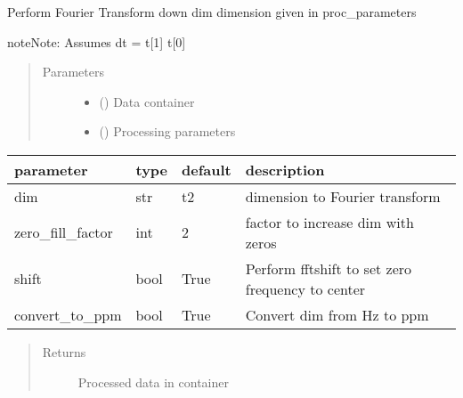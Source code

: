 \documentclass[letterpaper,10pt,english]{sphinxmanual}
\begin{document}
\begin{fulllineitems}
\label{\detokenize{dnpNMR:dnpLab.dnpNMR.fourier_transform}}
Perform Fourier Transform down dim dimension given in proc\_parameters

\begin{sphinxadmonition}{note}{Note:}
Assumes dt = t{[}1{]} \sphinxhyphen{} t{[}0{]}
\end{sphinxadmonition}
\begin{quote}\begin{description}
\item[{Parameters}] \leavevmode\begin{itemize}
\item {} 
 ({\hyperref[\detokenize{dnpData:dnpLab.dnpdata}]{}}\sphinxstyleliteralemphasis{\sphinxupquote{, }}) \sphinxhyphen{}\sphinxhyphen{} Data container

\item {} 
 (\sphinxstyleliteralemphasis{\sphinxupquote{, }}) \sphinxhyphen{}\sphinxhyphen{} Processing parameters

\end{itemize}

\end{description}\end{quote}


\begin{savenotes}\sphinxattablestart
\centering
\begin{tabulary}{\linewidth}[t]{|T|T|T|T|}
\hline

parameter
&
type
&
default
&
description
\\
\hline
dim
&
str
&
\textquotesingle{}t2\textquotesingle{}
&
dimension to Fourier transform
\\
\hline
zero\_fill\_factor
&
int
&
2
&
factor to increase dim with zeros
\\
\hline
shift
&
bool
&
True
&
Perform fftshift to set zero frequency to center
\\
\hline
convert\_to\_ppm
&
bool
&
True
&
Convert dim from Hz to ppm
\\
\hline
\end{tabulary}
\par
\sphinxattableend\end{savenotes}
\begin{quote}\begin{description}
\item[{Returns}] \leavevmode
Processed data in container


\end{description}
\end{quote}
\end{fulllineitems}
\end{document}
